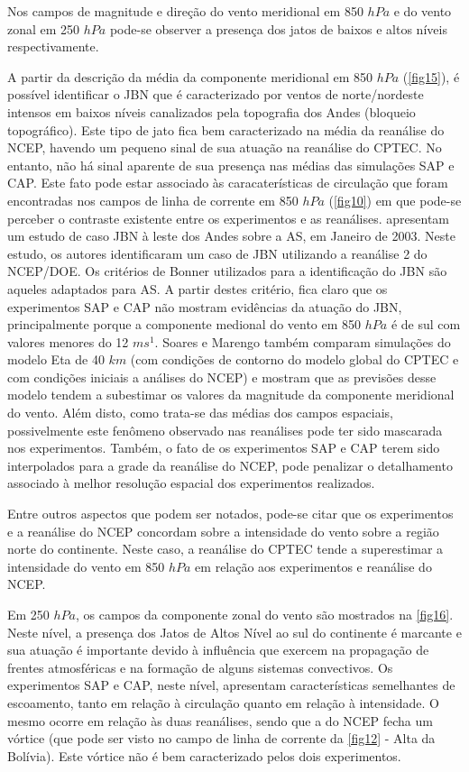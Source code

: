 Nos campos de magnitude e direção do vento meridional em 850 $hPa$ e do vento zonal em 250 $hPa$ pode-se observer a presença dos jatos de baixos e altos níveis respectivamente.

A partir da descrição da média da componente meridional em 850 $hPa$ (\autoref{fig15}), é possível identificar o JBN que é caracterizado por ventos de norte/nordeste intensos em baixos níveis canalizados pela topografia dos Andes (bloqueio topográfico). Este tipo de jato fica bem caracterizado na média da reanálise do NCEP, havendo um pequeno sinal de sua atuação na reanálise do CPTEC. No entanto, não há sinal aparente de sua presença nas médias das simulações SAP e CAP. Este fato pode estar associado às caracaterísticas de circulação que foram encontradas nos campos de linha de corrente em 850 $hPa$ (\autoref{fig10}) em que pode-se perceber o contraste existente entre os experimentos e as reanálises.  apresentam um estudo de caso JBN à leste dos Andes sobre a AS, em Janeiro de 2003. Neste estudo, os autores identificaram um caso de JBN utilizando a reanálise 2 do NCEP/DOE. Os critérios de Bonner utilizados para a identificação do JBN são aqueles adaptados para AS. A partir destes critério, fica claro que os experimentos SAP e CAP não mostram evidências da atuação do JBN, principalmente porque a componente medional do vento em 850 $hPa$ é de sul com valores menores do 12 $ms^{1}$. Soares e Marengo também comparam simulações do modelo Eta de 40 $km$ (com condições de contorno do modelo global do CPTEC e com condições iniciais a análises do NCEP) e mostram que as previsões desse modelo tendem a subestimar os valores da magnitude da componente meridional do vento. Além disto, como trata-se das médias dos campos espaciais, possivelmente este fenômeno observado nas reanálises pode ter sido mascarada nos experimentos. Também, o fato de os experimentos SAP e CAP terem sido interpolados para a grade da reanálise do NCEP, pode penalizar o detalhamento associado à melhor resolução espacial dos experimentos realizados.

Entre outros aspectos que podem ser notados, pode-se citar que os experimentos e a reanálise do NCEP concordam sobre a intensidade do vento sobre a região norte do continente. Neste caso, a reanálise do CPTEC tende a superestimar a intensidade do vento em 850 $hPa$ em relação aos experimentos e reanálise do NCEP. 

Em 250 $hPa$, os campos da componente zonal do vento são mostrados na \autoref{fig16}. Neste nível, a presença dos Jatos de Altos Nível ao sul do continente é marcante e sua atuação é importante devido à influência que exercem na propagação de frentes atmosféricas e na formação de alguns sistemas convectivos. Os experimentos SAP e CAP, neste nível, apresentam características semelhantes de escoamento, tanto em relação à circulação quanto em relação à intensidade. O mesmo ocorre em relação às duas reanálises, sendo que a do NCEP fecha um vórtice (que pode ser visto no campo de linha de corrente da \autoref{fig12} - Alta da Bolívia). Este vórtice não é bem caracterizado pelos dois experimentos. 

